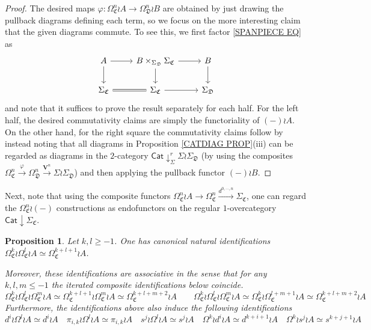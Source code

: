 \documentclass[a4paper,10pt
,draft
]{article}%
\numberwithin{equation}{section}
\numberwithin{figure}{section}
\newtheorem{proposition}[equation]{Proposition}%
\theoremstyle{definition} %
\newcommand{\1}{\ensuremath{\mathbbm 1}}%
\begin{document}
\begin{proof}
The desired maps 
$\varphi \colon
\Omega_{\mathfrak{C}}^n \wr A \to 
\Omega_{\mathfrak{D}}^n \wr B $
are obtained by just drawing the pullback diagrams defining each term,
so we focus on the more interesting claim that the given diagrams commute.
To see this, we first factor \eqref{SPANPIECE EQ} as
\[
\begin{tikzcd}
	A \ar{d} \ar{r} & B \times_{\Sigma_{\mathfrak{D}}} \Sigma_{\mathfrak{C}} \ar{r} \ar{d} &  \ar{d} B
\\
	\Sigma_{\mathfrak{C}} \ar[equal]{r} & \Sigma_{\mathfrak{C}} \ar{r} & \Sigma_{\mathfrak{D}}
\end{tikzcd}
\]
and note that it suffices to prove the result separately for each half.
For the left half, the desired commutativity claims are simply the functoriality of $(-) \wr A$. On the other hand, for the right square the commutativity claims follow by instead noting that all diagrams in 
Proposition \ref{CATDIAG PROP}(iii)
can be regarded as diagrams in the $2$-category
$\mathsf{Cat} \downarrow^r_{\Sigma} \Sigma \wr \Sigma_{\mathfrak{D}}$
(by using the composites 
$\Omega_{\mathfrak{C}}^n \xrightarrow{\varphi} \Omega_{\mathfrak{D}}^n \xrightarrow{\boldsymbol{V}^n} \Sigma \wr \Sigma_{\mathfrak{D}}$) 
and then applying the pullback functor $(-) \wr B$. 
\end{proof}



Next, note that using the composite functors 
$\Omega^n_{\mathfrak{C}} \wr A \to \Omega^n_{\mathfrak{C}} 
\xrightarrow{d^{0,\cdots,n}} \Sigma_{\mathfrak{C}}$,
one can regard the $\Omega_{\mathfrak{C}}^n \wr (-)$ constructions
as endofunctors on the regular $1$-overcategory
$\mathsf{Cat} \downarrow \Sigma_{\mathfrak{C}}$.


\begin{proposition}\label{ASSOCIDS PROP}
Let $k,l\geq -1$. One has canonical natural identifications 
$\Omega^k_{\mathfrak{C}} \wr \Omega^l_{\mathfrak{C}} \wr A
\simeq 
\Omega^{k+l+1}_{\mathfrak{C}} \wr A $.

Moreover, these identifications are associative in the sense that for any $k,l,m \leq -1$ the iterated composite identifications below coincide.
\[
\Omega^k_{\mathfrak{C}} \wr \Omega^l_{\mathfrak{C}} \wr \Omega^m_{\mathfrak{C}} \wr A
	\simeq 
\Omega^{k+l+1}_{\mathfrak{C}} \wr \Omega^m_{\mathfrak{C}} \wr A
	\simeq 
\Omega^{k+l+m+2}_{\mathfrak{C}} \wr A
\qquad
\Omega^k_{\mathfrak{C}} \wr \Omega^l_{\mathfrak{C}} \wr \Omega^m_{\mathfrak{C}} \wr A
	\simeq 
\Omega^{k}_{\mathfrak{C}} \wr \Omega^{l+m+1}_{\mathfrak{C}} \wr A
	\simeq 
\Omega^{k+l+m+2}_{\mathfrak{C}} \wr A
\]
Furthermore, the identifications above also induce the following identifications
\[
d^i \wr \Omega^l \wr A \simeq d^i \wr A
	\quad
\pi_{i,k} \wr \Omega^l \wr A \simeq \pi_{i,k} \wr A
	\quad
s^j \wr \Omega^l \wr A \simeq s^j \wr A
	\quad
\Omega^k \wr d^i \wr A \simeq d^{k+i+1} \wr A
	\quad
\Omega^k \wr s^j \wr A \simeq s^{k+j+1} \wr A
\]
\end{proposition}
\end{document}
